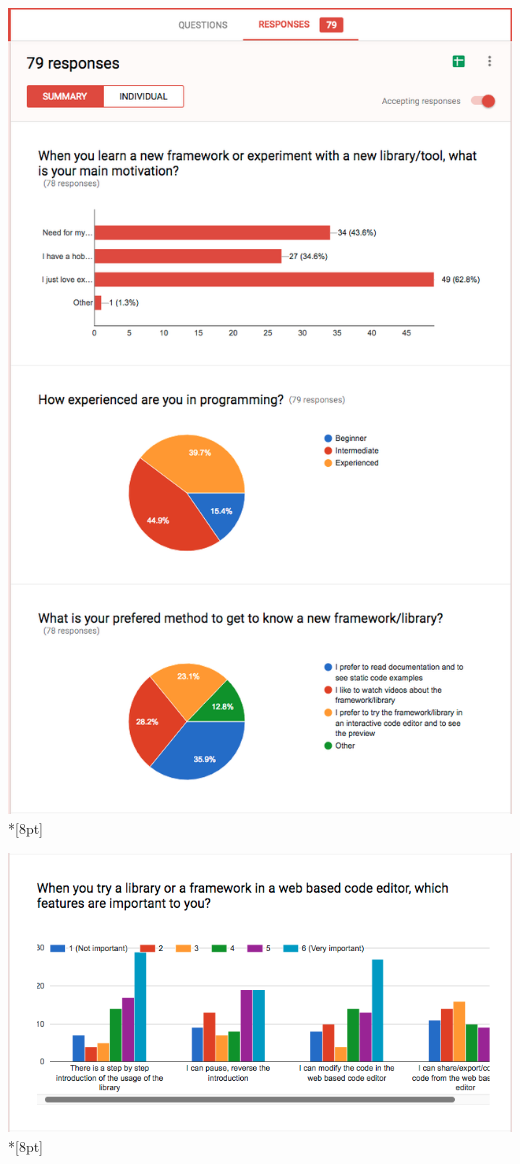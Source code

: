 \documentclass[12pt, a4paper, oneside, openright, medskipamount]{report}
\begin{document}
\includegraphics[width=1\textwidth]{assets/survey-result/1.png}\\*[8pt]

\includegraphics[width=1\textwidth]{assets/survey-result/2.png}\\*[8pt]
\end{document}
